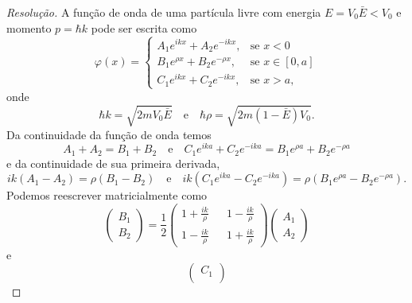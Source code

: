 \begin{proof}[Resolução]
    A função de onda de uma partícula livre com energia \(E = V_0 \bar{E} < V_0\) e momento \(p = \hbar k\) pode ser escrita como
    \begin{equation*}
        \varphi(x) = \begin{cases}
            A_1 e^{i k x} + A_2 e^{-i k x},&\text{se }x < 0\\
            B_1 e^{\rho x} + B_2 e^{-\rho x},&\text{se }x \in [0,a]\\
            C_1 e^{i k x} + C_2 e^{-i k x},&\text{se }x > a,
        \end{cases}
    \end{equation*}
    onde
    \begin{equation*}
        \hbar k = \sqrt{2m V_0 \bar{E}} \quad\text{e}\quad \hbar \rho = \sqrt{2 m (1 - \bar{E})V_0}.
    \end{equation*}
    Da continuidade da função de onda temos
    \begin{equation*}
        A_1 + A_2 = B_1 + B_2
        \quad\text{e}\quad
        C_1 e^{i k a} + C_2 e^{-ik a} = B_1 e^{\rho a} + B_2 e^{-\rho a}
    \end{equation*}
    e da continuidade de sua primeira derivada,
    \begin{equation*}
        ik(A_1 - A_2 ) = \rho(B_1  - B_2 )
        \quad\text{e}\quad
        ik(C_1 e^{i k a} - C_2 e^{-ik a}) = \rho(B_1 e^{\rho a} - B_2 e^{-\rho a}).
    \end{equation*}
    Podemos reescrever matricialmente como
    \begin{equation*}
        \begin{pmatrix}
            B_1 \\
            B_2
        \end{pmatrix} = \frac12
        \begin{pmatrix}
            1 + \frac{ik}{\rho} &&
            1 - \frac{ik}{\rho} \\
            1 - \frac{ik}{\rho} &&
            1 + \frac{ik}{\rho}
        \end{pmatrix}
        \begin{pmatrix}
            A_1\\
            A_2
        \end{pmatrix}
    \end{equation*}
    e
    \begin{equation*}
        \begin{pmatrix}
            C_1\\

\end{pmatrix}
\end{equation*}
\end{proof}
